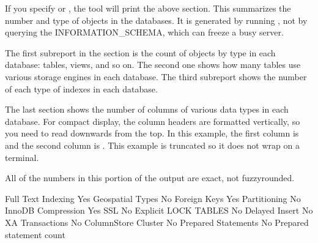 \documentclass[letterpaper,10pt,english]{sphinxmanual}
\begin{document}
If you specify {\hyperref[\detokenize{mariadb-database-summary:cmdoption-mariadb-database-summary-databases}]{}} or {\hyperref[\detokenize{mariadb-database-summary:cmdoption-mariadb-database-summary-all-databases}]{}}, the tool will print
the above section. This summarizes the number and type of objects in the
databases. It is generated by running , not by querying
the INFORMATION\_SCHEMA, which can freeze a busy server.

The first sub\sphinxhyphen{}report in the section is the count of objects by type in each
database: tables, views, and so on. The second one shows how many tables use
various storage engines in each database. The third sub\sphinxhyphen{}report shows the number
of each type of indexes in each database.

The last section shows the number of columns of various data types in each
database. For compact display, the column headers are formatted vertically, so
you need to read downwards from the top. In this example, the first column is
 and the second column is . This example is truncated so it
does not wrap on a terminal.

All of the numbers in this portion of the output are exact, not fuzzy\sphinxhyphen{}rounded.

\begin{sphinxVerbatim}[commandchars=\\\{\}]
       Full Text Indexing  Yes
         Geospatial Types  No
             Foreign Keys  Yes
             Partitioning  No
       InnoDB Compression  Yes
                      SSL  No
     Explicit LOCK TABLES  No
           Delayed Insert  No
          XA Transactions  No
      ColumnStore Cluster  No
      Prepared Statements  No
 Prepared statement count  
\end{sphinxVerbatim}
\end{document}
